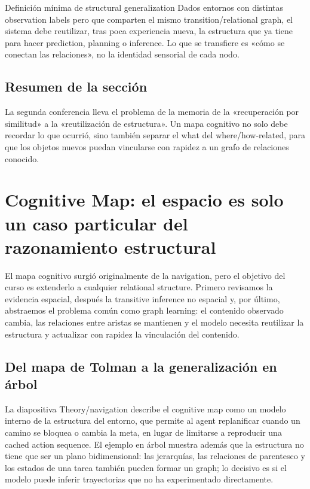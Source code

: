 \documentclass[a4paper]{article}
\begin{document}
\begin{importantbox}{Definición mínima de structural generalization}
Dados entornos con distintas observation labels pero que comparten el mismo transition/relational graph, el sistema debe reutilizar, tras poca experiencia nueva, la estructura que ya tiene para hacer prediction, planning o inference. Lo que se transfiere es «cómo se conectan las relaciones», no la identidad sensorial de cada nodo.
\end{importantbox}

\subsection{Resumen de la sección}

La segunda conferencia lleva el problema de la memoria de la «recuperación por similitud» a la «reutilización de estructura». Un mapa cognitivo no solo debe recordar lo que ocurrió, sino también separar el what del where/how-related, para que los objetos nuevos puedan vincularse con rapidez a un grafo de relaciones conocido.
\section{Cognitive Map: el espacio es solo un caso particular del razonamiento estructural}

El mapa cognitivo surgió originalmente de la navigation, pero el objetivo del curso es extenderlo a cualquier relational structure. Primero revisamos la evidencia espacial, después la transitive inference no espacial y, por último, abstraemos el problema común como graph learning: el contenido observado cambia, las relaciones entre aristas se mantienen y el modelo necesita reutilizar la estructura y actualizar con rapidez la vinculación del contenido.

\subsection{Del mapa de Tolman a la generalización en árbol}

La diapositiva Theory/navigation describe el cognitive map como un modelo interno de la estructura del entorno, que permite al agent replanificar cuando un camino se bloquea o cambia la meta, en lugar de limitarse a reproducir una cached action sequence. El ejemplo en árbol muestra además que la estructura no tiene que ser un plano bidimensional: las jerarquías, las relaciones de parentesco y los estados de una tarea también pueden formar un graph; lo decisivo es si el modelo puede inferir trayectorias que no ha experimentado directamente.
\end{document}
